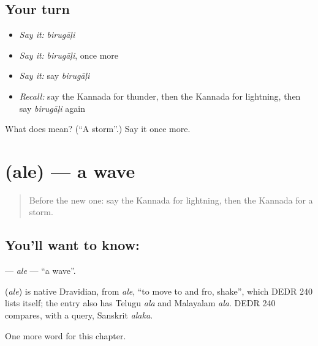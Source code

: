 \subsection*{Your turn}
\begin{itemize}
\raggedright
  \item \emph{Say it:} \emph{birugāḷi}
  \item \emph{Say it:} \emph{birugāḷi}, once more
  \item \emph{Say it:} say \emph{birugāḷi}
  \item \emph{Recall:} say the Kannada for thunder, then the Kannada for lightning, then say \emph{birugāḷi} again
\end{itemize}

\begin{tcolorbox}[breakable,colback=teal!4,colframe=teal!35!black,title={Before you move on}]
What does  mean? (\textquotedblleft{}A storm\textquotedblright{}.) Say it once more.
\end{tcolorbox}
\section[\texorpdfstring{\kn{ಅಲೆ} (ale)}{ಅಲೆ (ale)}]{ (ale) — a wave}

\label{lesson:KA-C128-ale}



\begin{quote}
Before the new one: say the Kannada for lightning, then the Kannada for a storm.
\end{quote}

\subsection*{You'll want to know: }
\textbf{} — \emph{ale} — \textquotedblleft{}a wave\textquotedblright{}.

\begin{cousinweb}
\textbf{} (\emph{ale}) is native Dravidian, from \emph{ale}, \textquotedblleft{}to move to and fro, shake\textquotedblright{}, which DEDR 240 lists itself; the entry also has Telugu \emph{ala} and Malayalam \emph{ala}. DEDR 240 compares, with a query, Sanskrit \emph{alaka}.
\end{cousinweb}

\begin{grammarlens}[title={What you've built}]
One more word for this chapter.
\end{grammarlens}


